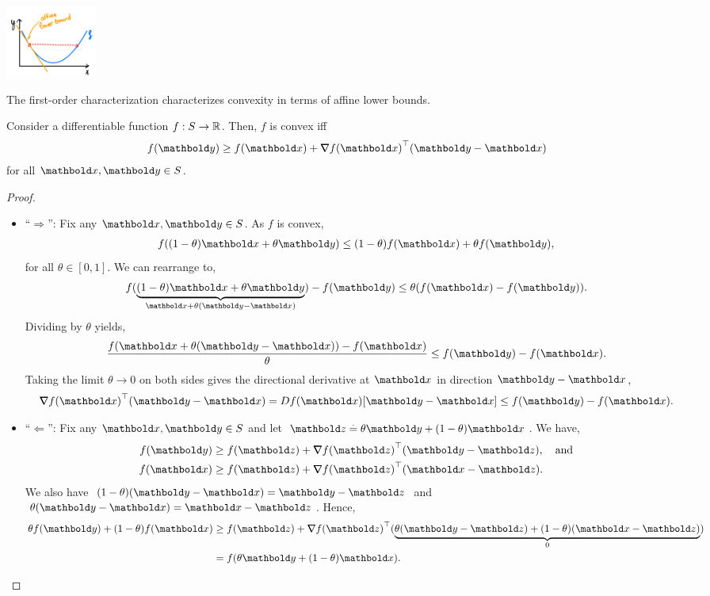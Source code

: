 \begin{marginfigure}
\centering\includegraphics[width=3cm]{notes/figures/1st_order_characterization.png}
\caption{The first-order characterization characterizes convexity in terms of affine lower bounds.}
\end{marginfigure}
\begin{thm} Consider a differentiable function $f: S \to \mathbb{R}$. Then, $f$ is convex iff \begin{align}
    f(\vy) \geq f(\vx) + \trans{\grad f(\vx)}(\vy - \vx)
\end{align} for all $\vx, \vy \in \sS$.
\end{thm}
\begin{proof} \begin{itemize}
    \item ``$\Rightarrow$'': Fix any $\vx, \vy \in \sS$. As $f$ is convex, \begin{align*}
        f((1-\theta)\vx + \theta\vy) \leq (1-\theta)f(\vx) + \theta f(\vy),
    \end{align*} for all $\theta \in [0,1]$. We can rearrange to, \begin{align*}
        f(\underbrace{(1-\theta)\vx + \theta\vy}_{\vx + \theta(\vy - \vx)}) - f(\vy) \leq \theta(f(\vx) - f(\vy)).
    \end{align*} Dividing by $\theta$ yields, \begin{align*}
        \frac{f(\vx + \theta(\vy - \vx)) - f(\vx)}{\theta} \leq f(\vy) - f(\vx).
    \end{align*} Taking the limit $\theta \to 0$ on both sides gives the directional derivative at $\vx$ in direction $\vy - \vx$, \begin{align*}
        \trans{\grad f(\vx)}(\vy - \vx) = D f(\vx)[\vy - \vx] \leq f(\vy) - f(\vx).
    \end{align*}
    
    \item ``$\Leftarrow$'': Fix any $\vx, \vy \in \sS$ and let $\vz \defeq \theta\vy + (1-\theta)\vx$. We have, \begin{align*}
        f(\vy) &\geq f(\vz) + \trans{\grad f(\vz)}(\vy - \vz), \quad\text{and} \\
        f(\vx) &\geq f(\vz) + \trans{\grad f(\vz)}(\vx - \vz).
    \end{align*} We also have $(1-\theta)(\vy-\vx) = \vy - \vz$ and $\theta(\vy - \vx) = \vx - \vz$. Hence, \begin{align*}
        \theta f(\vy) + (1-\theta) f(\vx) &\geq f(\vz) + \trans{\grad f(\vz)}(\underbrace{\theta(\vy - \vz) + (1-\theta)(\vx - \vz)}_{0}) \\
        &= f(\theta\vy + (1-\theta)\vx). \qedhere
    \end{align*}
\end{itemize}
\end{proof}

